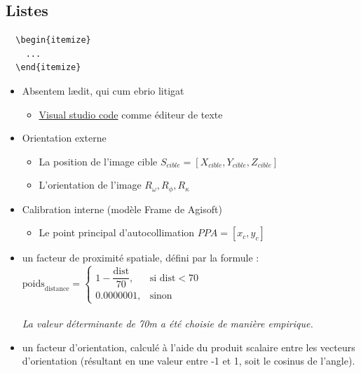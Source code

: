 \subsection{Listes}

\begin{verbatim}
  \begin{itemize}
    ...
  \end{itemize}
\end{verbatim}
\begin{itemize}
  \item Absentem lædit, qui cum ebrio litigat
  \begin{itemize}
      \item \href{https://code.visualstudio.com/}{Visual studio code} comme éditeur de texte
    \end{itemize}
  \item Orientation externe
  \begin{itemize}
      \item La position de l'image cible $S_{cible}=[X_{cible},Y_{cible},Z_{cible}]$
      \item L'orientation de l'image $R_\omega, R_\phi, R_\kappa$
  \end{itemize}
  \item Calibration interne (modèle \og Frame \fg de Agisoft)
  \begin{itemize}
      \item Le point principal d'autocollimation $PPA=[x_c,y_c]$
  \end{itemize}
  \item un facteur de proximité spatiale, défini par la formule : \\
        $
    \text{poids}_{\text{distance}} = 
    \begin{cases}
    1 - \dfrac{\text{dist}}{70}, & \text{si } \text{dist} < 70 \\
    0.0000001, & \text{sinon}
    \end{cases}
    $\\ \\
    \textit{\small La valeur déterminante de 70m a été choisie de manière empirique.}\\
\item un facteur d’orientation, calculé à l’aide du produit scalaire entre les vecteurs d’orientation (résultant en une valeur entre -1 et 1, soit le cosinus de l’angle).
\end{itemize}

